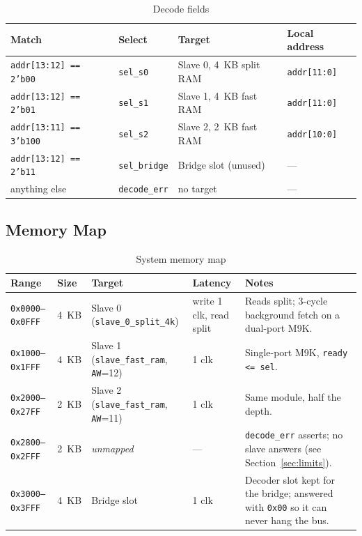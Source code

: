 \documentclass[11pt,a4paper]{article}
\newcommand{\sig}[1]{\texttt{#1}}
\begin{document}
\begin{table}[htbp]
\centering
\caption{Decode fields}
\label{tab:decode}
\small
\begin{tabular}{llll}
\toprule
\textbf{Match} & \textbf{Select} & \textbf{Target} & \textbf{Local address} \\
\midrule
\sig{addr[13:12] == 2'b00}  & \sig{sel\_s0}     & Slave 0, 4~KB split RAM & \sig{addr[11:0]} \\
\sig{addr[13:12] == 2'b01}  & \sig{sel\_s1}     & Slave 1, 4~KB fast RAM  & \sig{addr[11:0]} \\
\sig{addr[13:11] == 3'b100} & \sig{sel\_s2}     & Slave 2, 2~KB fast RAM  & \sig{addr[10:0]} \\
\sig{addr[13:12] == 2'b11}  & \sig{sel\_bridge} & Bridge slot (unused)    & --- \\
\midrule
anything else               & \sig{decode\_err} & no target               & --- \\
\bottomrule
\end{tabular}
\end{table}

\subsection{Memory Map}

\begin{table}[htbp]
\centering
\caption{System memory map}
\label{tab:memmap}
\small
\begin{tabularx}{\textwidth}{llllX}
\toprule
\textbf{Range} & \textbf{Size} & \textbf{Target} & \textbf{Latency} & \textbf{Notes} \\
\midrule
\texttt{0x0000--0x0FFF} & 4~KB & Slave 0 (\sig{slave\_0\_split\_4k}) & write 1 clk, read split & Reads split; 3-cycle background fetch on a dual-port M9K. \\
\texttt{0x1000--0x1FFF} & 4~KB & Slave 1 (\sig{slave\_fast\_ram}, \sig{AW}=12) & 1 clk & Single-port M9K, \sig{ready <= sel}. \\
\texttt{0x2000--0x27FF} & 2~KB & Slave 2 (\sig{slave\_fast\_ram}, \sig{AW}=11) & 1 clk & Same module, half the depth. \\
\texttt{0x2800--0x2FFF} & 2~KB & \emph{unmapped} & --- & \sig{decode\_err} asserts; no slave answers (see Section~\ref{sec:limits}). \\
\texttt{0x3000--0x3FFF} & 4~KB & Bridge slot & 1 clk & Decoder slot kept for the bridge; answered with \sig{0x00} so it can never hang the bus. \\
\bottomrule
\end{tabularx}
\end{table}
\end{document}
